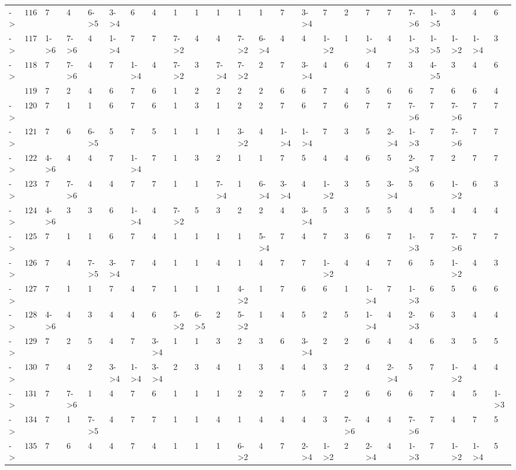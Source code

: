 \documentclass[6pt]{article}
\begin{document}
\begin{landscape}
{\begin{longtable}{lrllllllllllllllllllllll}
-\textgreater &$116$&7&4&6-\textgreater 5&3-\textgreater 4&6&4&1&1&1&1&1&7&3-\textgreater 4&7&2&7&7&7-\textgreater 6&1-\textgreater 5&3&4&6\tabularnewline
-\textgreater &$117$&1-\textgreater 6&7-\textgreater 6&4&1-\textgreater 4&7&7&7-\textgreater 2&4&4&7-\textgreater 2&6-\textgreater 4&4&4&1-\textgreater 2&1&1-\textgreater 4&4&1-\textgreater 3&1-\textgreater 5&1-\textgreater 2&1-\textgreater 4&3\tabularnewline
-\textgreater &$118$&7&7-\textgreater 6&4&7&1-\textgreater 4&4&7-\textgreater 2&3&7-\textgreater 4&7-\textgreater 2&2&7&3-\textgreater 4&4&6&4&7&3&4-\textgreater 5&3&4&6\tabularnewline
&$119$&7&2&4&6&7&6&1&2&2&2&2&6&6&7&4&5&6&6&7&6&6&4\tabularnewline
-\textgreater &$120$&7&1&1&6&7&6&1&3&1&2&2&7&6&7&6&7&7&7-\textgreater 6&7&7-\textgreater 6&7&7\tabularnewline
-\textgreater &$121$&7&6&6-\textgreater 5&5&7&5&1&1&1&3-\textgreater 2&4&1-\textgreater 4&1-\textgreater 4&7&3&5&2-\textgreater 4&1-\textgreater 3&7&7-\textgreater 6&7&7\tabularnewline
-\textgreater &$122$&4-\textgreater 6&4&4&7&1-\textgreater 4&7&1&3&2&1&1&7&5&4&4&6&5&2-\textgreater 3&7&2&7&7\tabularnewline
-\textgreater &$123$&7&7-\textgreater 6&4&4&7&7&1&1&7-\textgreater 4&1&6-\textgreater 4&3-\textgreater 4&4&1-\textgreater 2&3&5&3-\textgreater 4&5&6&1-\textgreater 2&6&3\tabularnewline
-\textgreater &$124$&4-\textgreater 6&3&3&6&1-\textgreater 4&4&7-\textgreater 2&5&3&2&2&4&3-\textgreater 4&5&3&5&5&4&5&4&4&4\tabularnewline
-\textgreater &$125$&7&1&1&6&7&4&1&1&1&1&5-\textgreater 4&7&4&7&3&6&7&1-\textgreater 3&7&7-\textgreater 6&7&7\tabularnewline
-\textgreater &$126$&7&4&7-\textgreater 5&3-\textgreater 4&7&4&1&1&4&1&4&7&7&1-\textgreater 2&4&4&7&6&5&1-\textgreater 2&4&3\tabularnewline
-\textgreater &$127$&7&1&1&7&4&7&1&1&1&4-\textgreater 2&1&7&6&6&1&1-\textgreater 4&7&1-\textgreater 3&6&5&6&6\tabularnewline
-\textgreater &$128$&4-\textgreater 6&4&3&4&4&6&5-\textgreater 2&6-\textgreater 5&2&5-\textgreater 2&1&4&5&2&5&1-\textgreater 4&4&2-\textgreater 3&6&3&4&4\tabularnewline
-\textgreater &$129$&7&2&5&4&7&3-\textgreater 4&1&1&3&2&3&6&3-\textgreater 4&2&2&6&4&4&6&3&5&5\tabularnewline
-\textgreater &$130$&7&4&2&3-\textgreater 4&1-\textgreater 4&3-\textgreater 4&2&3&4&1&3&4&4&3&2&4&2-\textgreater 4&5&7&1-\textgreater 2&4&4\tabularnewline
-\textgreater &$131$&7&7-\textgreater 6&1&4&7&6&1&1&1&2&2&7&5&7&2&6&6&6&7&4&5&1-\textgreater 3\tabularnewline
-\textgreater &$134$&7&1&7-\textgreater 5&4&7&7&1&1&4&1&4&4&4&3&7-\textgreater 6&4&4&7-\textgreater 6&7&4&7&5\tabularnewline
-\textgreater &$135$&7&6&4&4&7&4&1&1&1&6-\textgreater 2&4&7&2-\textgreater 4&1-\textgreater 2&2&2-\textgreater 4&4&1-\textgreater 3&7&1-\textgreater 2&1-\textgreater 4&5\tabularnewline

\end{longtable}}
\end{landscape}
\end{document}
